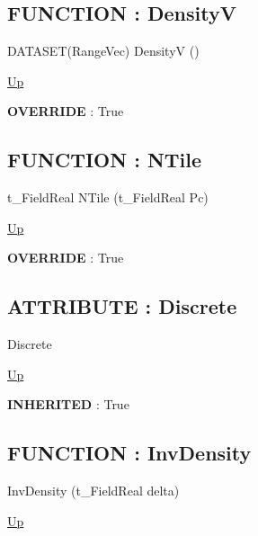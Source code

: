 \subsection*{FUNCTION : DensityV}
\hypertarget{ecldoc:linearregression.ols.distributionbase.densityv}{}
\begin{minipage}[t]{\textwidth}
\begin{flushleft}
DATASET(RangeVec) DensityV ()
\end{flushleft}
\end{minipage}
\hyperlink{ecldoc:linearregression.ols.tdistribution}{Up}

\par
\par
\textbf{OVERRIDE} : True \\
\subsection*{FUNCTION : NTile}
\hypertarget{ecldoc:linearregression.ols.distributionbase.ntile}{}
\begin{minipage}[t]{\textwidth}
\begin{flushleft}
t\_FieldReal NTile (t\_FieldReal Pc)
\end{flushleft}
\end{minipage}
\hyperlink{ecldoc:linearregression.ols.tdistribution}{Up}

\par
\par
\textbf{OVERRIDE} : True \\
\subsection*{ATTRIBUTE : Discrete}
\hypertarget{ecldoc:linearregression.ols.distributionbase.discrete}{}
\begin{minipage}[t]{\textwidth}
\begin{flushleft}
 Discrete 
\end{flushleft}
\end{minipage}
\hyperlink{ecldoc:linearregression.ols.tdistribution}{Up}

\par
\par
\textbf{INHERITED} : True \\
\subsection*{FUNCTION : InvDensity}
\hypertarget{ecldoc:linearregression.ols.tdistribution.invdensity}{}
\begin{minipage}[t]{\textwidth}
\begin{flushleft}
 InvDensity (t\_FieldReal delta)
\end{flushleft}
\end{minipage}
\hyperlink{ecldoc:linearregression.ols.tdistribution}{Up}

